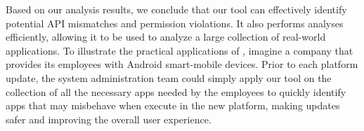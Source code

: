 Based on our analysis results, we conclude that our tool can effectively
identify potential API mismatches and permission violations. It also performs
analyses efficiently, allowing it to be used to analyze a large collection of
real-world applications. To illustrate the practical applications of \@approach,
imagine a company that provides its employees with Android smart-mobile devices.
Prior to each platform update, the system administration team could simply apply
our tool on the collection of all the necessary apps needed by the employees to
quickly identify apps that may misbehave when execute in the new platform,
making updates safer and improving the overall user experience.
